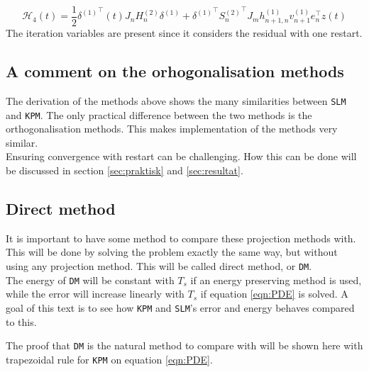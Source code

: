 \begin{equation}
\mathcal{H}_4 (t) = \frac{1}{2} {\delta^{(1)}}^\top (t) J_n H_n^{(2)} \delta^{(1)} + {\delta^{(1)}}^\top {S_n^{(2)}}^\top  J_m h_{n+1,n}^{(1)} v_{n+1}^{(1)} e_n^\top z(t)
\label{eqn:energy4}
\end{equation}
The iteration variables are present since it considers the residual with one restart.

\subsection{A comment on the orhogonalisation methods} %
The  derivation of the methods above shows the many similarities between \texttt{SLM} and \texttt{KPM}. The only practical difference between the two methods is the orthogonalisation methods. This makes implementation of the methods very similar.  \\

\noindent Ensuring convergence with restart can be challenging. How this can be done will be discussed in section \ref{sec:praktisk} and \ref{sec:resultat}.

\subsection{Direct method} \label{sec:DM}
It is important to have some method to compare these projection methods with. This will be done by solving the problem exactly the same way, but without using any projection method. This will be called direct method, or \texttt{DM}. \\

\noindent The energy of \texttt{DM} will be constant with $T_s$ if an energy preserving method is used, while the error will increase linearly with $T_s$ \cite{linearerrorgrowth} if equation \eqref{eqn:PDE} is solved. A goal of this text is to see how \texttt{KPM} and \texttt{SLM}'s error and energy behaves compared to this. 

\noindent The proof that \texttt{DM} is the natural method to compare with will be shown here with trapezoidal rule for \texttt{KPM} on equation \eqref{eqn:PDE}. %

